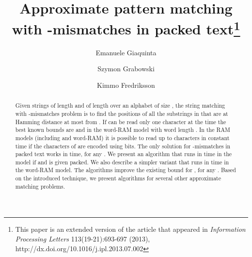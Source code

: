 \documentclass{llncs}
\newcommand{\sabound}{\xspace}
\newcommand{\acbound}{\xspace}
\newcommand{\wrbound}{\xspace}
\begin{document}
\title{Approximate pattern matching with -mismatches in packed text\thanks{This paper is an extended version of the article that appeared in \emph{Information Processing Letters} 113(19-21):693-697 (2013), http://dx.doi.org/10.1016/j.ipl.2013.07.002}}

\author{Emanuele Giaquinta \and Szymon Grabowski \and Kimmo Fredriksson}


\maketitle

\begin{abstract}
Given strings  of length  and  of length  over an alphabet
of size , the string matching with -mismatches problem is
to find the positions of all the substrings in  that are at Hamming
distance at most  from . If  can be read only one character
at the time the best known bounds are  and  in the word-RAM model with word length .
In the RAM models (including  and word-RAM)
it is possible to read up
to  characters in constant time if the
characters of  are encoded using  bits. The
only solution for -mismatches in packed text works in \sabound
time, for any . We present an algorithm that runs in
time \acbound in the  model if  and  is
given packed. We also describe a simpler variant that runs in time
\wrbound in the word-RAM model. The algorithms improve the existing
bound for , for any . Based on the introduced technique, we present
algorithms for several other approximate matching problems.
\end{abstract}
\end{document}
